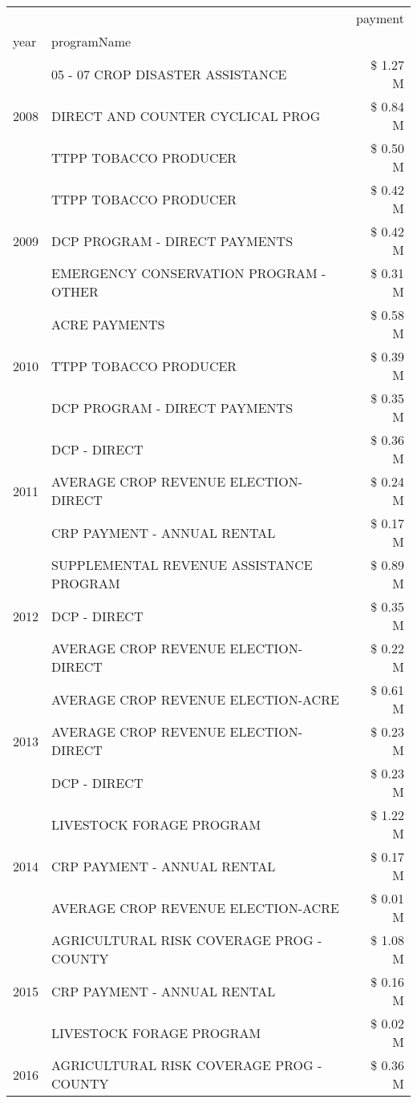 \begin{tabular}{llr}
\toprule
 &  & payment \\
year & programName &  \\
\midrule
\multirow[t]{3}{*}{2008} & 05 - 07 CROP DISASTER ASSISTANCE & \$ 1.27 M \\
 & DIRECT AND COUNTER CYCLICAL PROG & \$ 0.84 M \\
 & TTPP TOBACCO PRODUCER & \$ 0.50 M \\
\cline{1-3}
\multirow[t]{3}{*}{2009} & TTPP TOBACCO PRODUCER & \$ 0.42 M \\
 & DCP PROGRAM - DIRECT PAYMENTS & \$ 0.42 M \\
 & EMERGENCY CONSERVATION PROGRAM - OTHER & \$ 0.31 M \\
\cline{1-3}
\multirow[t]{3}{*}{2010} & ACRE PAYMENTS & \$ 0.58 M \\
 & TTPP TOBACCO PRODUCER & \$ 0.39 M \\
 & DCP PROGRAM - DIRECT PAYMENTS & \$ 0.35 M \\
\cline{1-3}
\multirow[t]{3}{*}{2011} & DCP - DIRECT & \$ 0.36 M \\
 & AVERAGE CROP REVENUE ELECTION-DIRECT & \$ 0.24 M \\
 & CRP PAYMENT - ANNUAL RENTAL & \$ 0.17 M \\
\cline{1-3}
\multirow[t]{3}{*}{2012} & SUPPLEMENTAL REVENUE ASSISTANCE PROGRAM & \$ 0.89 M \\
 & DCP - DIRECT & \$ 0.35 M \\
 & AVERAGE CROP REVENUE ELECTION-DIRECT & \$ 0.22 M \\
\cline{1-3}
\multirow[t]{3}{*}{2013} & AVERAGE CROP REVENUE ELECTION-ACRE & \$ 0.61 M \\
 & AVERAGE CROP REVENUE ELECTION-DIRECT & \$ 0.23 M \\
 & DCP - DIRECT & \$ 0.23 M \\
\cline{1-3}
\multirow[t]{3}{*}{2014} & LIVESTOCK FORAGE PROGRAM & \$ 1.22 M \\
 & CRP PAYMENT - ANNUAL RENTAL & \$ 0.17 M \\
 & AVERAGE CROP REVENUE ELECTION-ACRE & \$ 0.01 M \\
\cline{1-3}
\multirow[t]{3}{*}{2015} & AGRICULTURAL RISK COVERAGE PROG - COUNTY & \$ 1.08 M \\
 & CRP PAYMENT - ANNUAL RENTAL & \$ 0.16 M \\
 & LIVESTOCK FORAGE PROGRAM & \$ 0.02 M \\
\cline{1-3}
\multirow[t]{3}{*}{2016} & AGRICULTURAL RISK COVERAGE PROG - COUNTY & \$ 0.36 M \\

\end{tabular}
